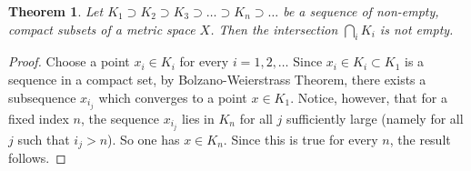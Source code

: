 \documentclass[12pt]{article}
\newtheorem{theorem}{Theorem}
\theoremstyle{remark}
\begin{document}
\begin{theorem}
Let $K_1\supset K_2\supset K_3 \supset \ldots \supset K_n\supset \ldots$ be a sequence of non-empty, compact subsets of a metric space $X$. Then the intersection $\bigcap_i K_i$ is not empty.
\end{theorem}
\begin{proof}
Choose a point $x_i\in K_i$ for every $i=1,2,\ldots$
Since $x_i \in K_i \subset K_1$ is a sequence in a compact set, by Bolzano-Weierstrass Theorem, there exists a subsequence $x_{i_j}$ which converges to a point $x\in K_1$. Notice, however, that for a fixed index $n$, the sequence $x_{i_j}$ lies in $K_n$ for all $j$ sufficiently large (namely for all $j$ such that $i_j>n$). So one has $x\in K_n$. 
Since this is true for every $n$, the result follows.
\end{proof}
\end{document}
